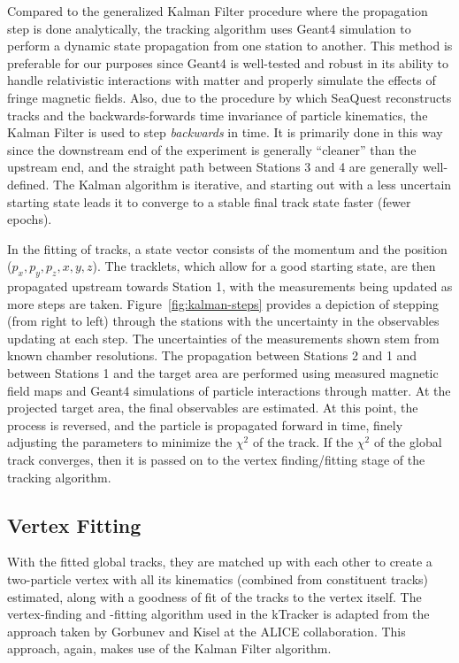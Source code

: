 Compared to the generalized Kalman Filter procedure where the propagation step is done analytically, the tracking algorithm uses Geant4 simulation to perform a dynamic state propagation from one station to another. This method is preferable for our purposes since Geant4 is well-tested and robust in its ability to handle relativistic interactions with matter and properly simulate the effects of fringe magnetic fields. Also, due to the procedure by which SeaQuest reconstructs tracks and the backwards-forwards time invariance of particle kinematics, the Kalman Filter is used to step \emph{backwards} in time. It is primarily done in this way since the downstream end of the experiment is generally ``cleaner'' than the upstream end, and the straight path between Stations 3 and 4 are generally well-defined. The Kalman algorithm is iterative, and starting out with a less uncertain starting state leads it to converge to a stable final track state faster (fewer epochs).

In the fitting of tracks, a state vector consists of the momentum and the position ($p_x, p_y, p_z, x, y, z$). The tracklets, which allow for a good starting state, are then propagated upstream towards Station 1, with the measurements being updated as more steps are taken. Figure~\ref{fig:kalman-steps} provides a depiction of stepping (from right to left) through the stations with the uncertainty in the observables updating at each step. The uncertainties of the measurements shown stem from known chamber resolutions. The propagation between Stations 2 and 1 and between Stations 1 and the target area are performed using measured magnetic field maps and Geant4 simulations of particle interactions through matter. At the projected target area, the final observables are estimated. At this point, the process is reversed, and the particle is propagated forward in time, finely adjusting the parameters to minimize the $\chi^2$ of the track. If the $\chi^2$ of the global track converges, then it is passed on to the vertex finding/fitting stage of the tracking algorithm.

\subsection{Vertex Fitting}

With the fitted global tracks, they are matched up with each other to create a two-particle vertex with all its kinematics (combined from constituent tracks) estimated, along with a goodness of fit of the tracks to the vertex itself. The vertex-finding and -fitting algorithm used in the kTracker is adapted from the approach taken by Gorbunev and Kisel at the ALICE collaboration\cite{Gorbunov:2010yda}. This approach, again, makes use of the Kalman Filter algorithm.

